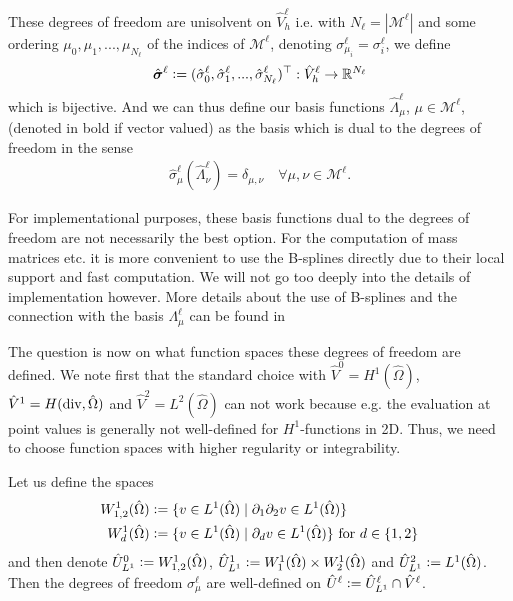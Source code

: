 \documentclass[../master_thesis.tex]{subfiles}
\begin{document}
These degrees of freedom are unisolvent on $\hat{V}^\ell_h$ i.e. with $N_\ell = |\mathcal{M}^\ell|$ 
and some ordering $\mu_0, \mu_1, ..., \mu_{N_\ell}$ 
of the indices of $\mathcal{M}^\ell$, denoting $\sigma^\ell_{\mu_i} = \sigma_i^\ell$,  we
define 
\begin{align*}
    \hat{\bm{\sigma}}^\ell \vcentcolon= (\hat{\sigma}^\ell_0, \hat{\sigma}^\ell_1, ..., 
        \hat{\sigma}^\ell_{N_\ell})^\top
    : \hat{V}^\ell_h \rightarrow \mathbb{R}^{N_\ell}
\end{align*}
which is bijective.
And we can thus define our basis functions 
$\hat{\Lambda}^\ell_\mu$, $\mu \in \mathcal{M}^\ell$, (denoted in bold if vector valued) 
as the basis which is dual to the 
degrees of freedom in the sense 
\begin{align*}
    \hat{\sigma}_\mu^\ell(\hat{\Lambda}^\ell_\nu) = \delta_{\mu,\nu} \quad \forall \mu, \nu \in \mathcal{M}^\ell.
\end{align*}

\begin{remark}
    For implementational purposes, these basis functions dual to the degrees of freedom are not necessarily the 
    best option. For the computation of mass matrices etc. 
    it is more convenient to use the B-splines directly due to their 
    local support and fast computation.
    We will not 
    go too deeply into the details of implementation however. More details about the 
    use of B-splines and the connection with the basis $\Lambda^\ell_\mu$ can be found 
    in \cite[Sec.\,4.8]{multipatch_paper} 
\end{remark}

The question is now  on what function spaces these degrees of freedom are defined. We note first that 
the standard choice with $\hat{V}^0 = H^1(\hat{\Omega})$, 
$\hat{V}^1 = H(\operatorname{div},\hat{\Omega})$ and $\hat{V}^2 = L^2(\hat{\Omega})$ can not work 
because e.g. the evaluation at point values is generally not well-defined for $H^1$-functions in 2D. Thus, 
we need to choose function spaces with higher regularity or integrability.

Let us define the spaces
\begin{align*}
    W^1_{1,2}(\hat{\Omega}) &\vcentcolon= \{ v \in L^1(\hat{\Omega}) \mid \partial_1 \partial_2 v
        \in L^1(\hat{\Omega}) \}
    \\  W^1_d(\hat{\Omega}) &\vcentcolon= \{ v \in L^1(\hat{\Omega}) \mid \partial_d v
        \in L^1(\hat{\Omega}) \} \text{ for } d\in \{1,2\}
\end{align*}
and then denote $\hat{U}_{L^1}^0 \vcentcolon= W^1_{1,2}(\hat{\Omega})$, 
$\hat{U}_{L^1}^1 \vcentcolon= W^1_1(\hat{\Omega}) \times W^1_2(\hat{\Omega})$
and $\hat{U}_{L^1}^2 \vcentcolon= L^1(\hat{\Omega})$. Then the degrees of freedom $\sigma_\mu^\ell$ are 
well-defined on $\hat{U}^\ell \vcentcolon= \hat{U}_{L^1}^\ell \cap \hat{V}^\ell$. 
\end{document}
